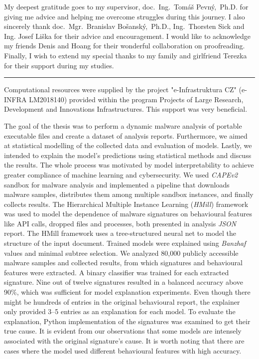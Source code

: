 \documentclass[11pt,twoside,a4paper]{book}
\begin{document}
	\translate

	{
		
		\newpage
	}

	\coverpagestarts

	\acknowledgements
	\noindent
	My deepest gratitude goes to my supervisor, doc.~Ing.~Tomáš Pevný,~Ph.D. for giving me advice and helping me overcome struggles during this journey. I also sincerely thank doc.~Mgr.~Branislav Bošanský,~Ph.D., Ing.~Thorsten Sick and Ing. Josef Liška for their advice and encouragement. I would like to acknowledge my friends Denis and Hoang for their wonderful collaboration on proofreading. Finally, I wish to extend my special thanks to my family and girlfriend Terezka for their support during my studies.

	\noindent\rule{\textwidth}{0.4pt}

	\noindent Computational resources were supplied by the project "e-Infrastruktura CZ" (e-INFRA LM2018140) provided within the program Projects of Large Research, Development and Innovations Infrastructures. This support was very beneficial.



	\abstractpage

	The goal of the thesis was to perform a dynamic malware analysis of portable executable files and create a dataset of analysis reports. Furthermore, we aimed at statistical modelling of the collected data and evaluation of models. Lastly, we intended to explain the model's predictions using statistical methods and discuss the results. The whole process was motivated by model interpretability to achieve greater compliance of machine learning and cybersecurity. We used \emph{CAPEv2} sandbox for malware analysis and implemented a pipeline that downloads malware samples, distributes them among multiple sandbox instances, and finally collects results. The Hierarchical Multiple Instance Learning (\emph{HMill}) framework was used to model the dependence of malware signatures on behavioural features like API calls, dropped files and processes, both presented in analysis \emph{JSON} report. The HMill framework uses a tree-structured neural net to model the structure of the input document. Trained models were explained using \emph{Banzhaf} values and minimal subtree selection. We analyzed 80,000 publicly accessible malware samples and collected results, from which signatures and behavioural features were extracted. A binary classifier was trained for each extracted signature. Nine out of twelve signatures resulted in a balanced accuracy above 90\%, which was sufficient for model explanation experiments. Even though there might be hundreds of entries in the original behavioural report, the explainer only provided 3--5 entries as an explanation for each model. To evaluate the explanation, Python implementation of the signatures was examined to get their true cause. It is evident from our observations that some models are intensely associated with the original signature's cause. It is worth noting that there are cases where the model used different behavioural features with high accuracy. \
	
\end{document}
